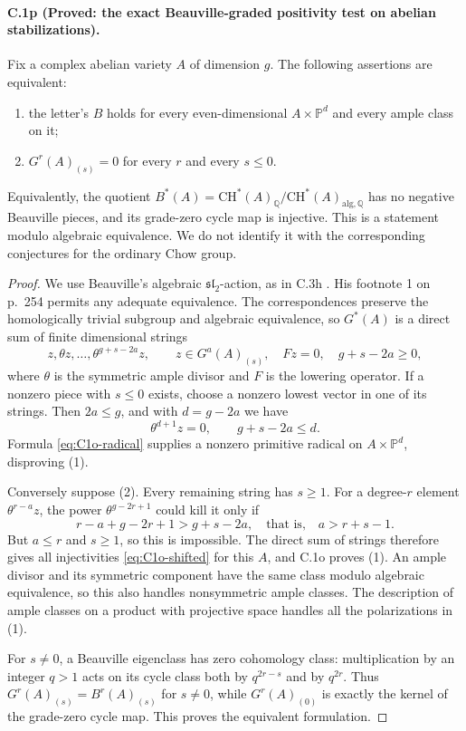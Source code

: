 \paragraph{C.1p (Proved: the exact Beauville-graded positivity test on abelian stabilizations).}
Fix a complex abelian variety $A$ of dimension $g$. The following
assertions are equivalent:
\begin{enumerate}
\item the letter's $B$ holds for every even-dimensional
$A\times\mathbb P^d$ and every ample class on it;
\item $G^r(A)_{(s)}=0$ for every $r$ and every $s\le0$.
\end{enumerate}
Equivalently, the quotient
$B^*(A)=\mathrm{CH}^*(A)_{\mathbb Q}/
\mathrm{CH}^*(A)_{\mathrm{alg},\mathbb Q}$ has no negative
Beauville pieces, and its grade-zero cycle map is injective.
This is a statement modulo algebraic equivalence. We do not identify
it with the corresponding conjectures for the ordinary Chow group.

\begin{proof}
We use Beauville's algebraic $\mathfrak{sl}_2$-action, as in C.3h
\citep[Theorem 4.2 and Proposition 5.2, pp.~260--261]{rootBeauville2010}.
His footnote 1 on p.~254 permits any adequate equivalence.
The correspondences preserve the homologically trivial subgroup and
algebraic equivalence, so $G^*(A)$ is a direct sum of finite
dimensional strings
\[
 z,\theta z,\ldots,\theta^{g+s-2a}z,
 \qquad z\in G^a(A)_{(s)},\quad Fz=0,
 \quad g+s-2a\ge0,
\]
where $\theta$ is the symmetric ample divisor and $F$ is the lowering
operator. If a nonzero piece with $s\le0$ exists, choose a nonzero
lowest vector in one of its strings. Then $2a\le g$, and with
$d=g-2a$ we have
\[
                   \theta^{d+1}z=0,
       \qquad g+s-2a\le d.
\]
Formula \eqref{eq:C1o-radical} supplies a nonzero primitive radical
on $A\times\mathbb P^d$, disproving (1).

Conversely suppose (2). Every remaining string has $s\ge1$.
For a degree-$r$ element $\theta^{r-a}z$, the power
$\theta^{g-2r+1}$ could kill it only if
\[
 r-a+g-2r+1>g+s-2a,
 \quad\text{that is,}\quad a>r+s-1.
\]
But $a\le r$ and $s\ge1$, so this is impossible. The direct sum of
strings therefore gives all injectivities
\eqref{eq:C1o-shifted} for this $A$, and C.1o proves (1).
An ample divisor and its symmetric component have the same class
modulo algebraic equivalence, so this also handles nonsymmetric
ample classes. The description of ample classes on a product with
projective space handles all the polarizations in (1).

For $s\ne0$, a Beauville eigenclass has zero cohomology class:
multiplication by an integer $q>1$ acts on its cycle class both by
$q^{2r-s}$ and by $q^{2r}$. Thus $G^r(A)_{(s)}=B^r(A)_{(s)}$
for $s\ne0$, while $G^r(A)_{(0)}$ is exactly the kernel of the
grade-zero cycle map. This proves the equivalent formulation.
\end{proof}

